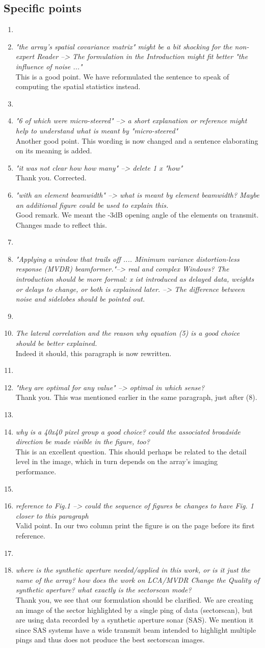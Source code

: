 \documentclass[11pt]{article} %
\newcommand\1{\vec 1}
\newcommand\q[1]{\textit{#1}}
\newcommand\qi[1]{\item\q{#1}}
\newcommand\hi[1]{\item[\textbf{#1}]}
\newcommand\ans[1]{#1}
\newcommand\ai[1]{\\[.5\baselineskip]\ans{#1}}
\begin{document}
\subsection*{Specific points}

\begin{enumerate}
\hi{Abstract}
\qi{"the array's spatial covariance matrix" might be a bit shocking for the non-expert Reader --> The formulation in the Introduction might fit better "the influence of noise ..."}
\ai{This is a good point. We have reformulated the sentence to speak of computing the spatial statistics instead.}
%
\hi{Page 2}
\qi{"6 of which were micro-steered" --> a short explanation or reference might help to understand what is meant by "micro-steered"}
\ai{Another good point. This wording is now changed and a sentence elaborating on its meaning is added.}
%
\qi{"it was not clear how how many" --> delete 1 x "how"}
\ai{Thank you. Corrected.}
%
\qi{"with an element beamwidth" --> what is meant by element beamwidth? Maybe an additional figure could be used to explain this.}
\ai{Good remark. We meant the -3dB opening angle of the elements on transmit. Changes made to reflect this.}
%
\hi{Page 3, after (1)}
\qi{"Applying a window that trails off .... Minimum variance distortion-less response (MVDR) beamformer."--> real and complex Windows? The introduction should be more formal: x ist introduced as delayed data, weights or delays to change, or both is explained later. --> The difference between noise and sidelobes should be pointed out.}
\ai{}
%
\hi{Page 5, equation (5)}
\qi{The lateral correlation and the reason why equation (5) is a good choice should be better explained.}
\ai{Indeed it should, this paragraph is now rewritten.}
%
\hi{Page 6, last row}
\qi{"they are optimal for any value" --> optimal in which sense?}
\ai{Thank you. This was mentioned earlier in the same paragraph, just after (8).}
%
\hi{Fig 3}
\qi{why is a 40x40 pixel group a good choice? could the associated broadside direction be made visible in the figure, too?}
\ai{This is an excellent question. This should perhaps be related to the detail level in the image, which in turn depends on the array's imaging performance.}
%
\hi{Page 8}
\qi{reference to Fig.1 --> could the sequence of figures be changes to have Fig. 1 closer to this paragraph}
\ai{Valid point. In our two column print the figure is on the page before its first reference. }
%
\hi{Page 11}
\qi{where is the synthetic aperture needed/applied in this work, or is it just the name of the array? how does the work on LCA/MVDR Change the Quality of synthetic aperture?
what exactly is the sectorscan mode?}
\ai{Thank you, we see that our formulation should be clarified. We are creating an image of the sector highlighted by a single ping of data (sectorscan), but are using data recorded by a synthetic aperture sonar (SAS). We mention it since SAS systems have a wide transmit beam intended to highlight multiple pings and thus does not produce the best sectorscan images.}
%
\end{enumerate}
\end{document}
